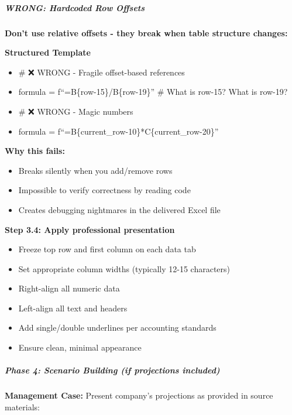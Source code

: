 \documentclass[11pt]{article}
\begin{document}
\subparagraph{WRONG: Hardcoded Row Offsets}\mbox{}\par

\textbf{Don't use relative offsets - they break when table structure changes:}


\textbf{Structured Template}
\begin{itemize}[leftmargin=*,itemsep=2pt,topsep=2pt]
\item {} \# ❌ WRONG - Fragile offset-based references
\item {} formula = f``=B\{row-15\}/B\{row-19\}'' \# What is row-15? What is row-19?
\item {} \# ❌ WRONG - Magic numbers
\item {} formula = f``=B\{current\_\allowbreak{}row-10\}*C\{current\_\allowbreak{}row-20\}''
\end{itemize}

\textbf{Why this fails:}

\begin{itemize}[leftmargin=*,itemsep=2pt,topsep=2pt]
\item {} Breaks silently when you add/remove rows
\item {} Impossible to verify correctness by reading code
\item {} Creates debugging nightmares in the delivered Excel file
\end{itemize}




\textbf{Step 3.4: Apply professional presentation}

\begin{itemize}[leftmargin=*,itemsep=2pt,topsep=2pt]
\item {} Freeze top row and first column on each data tab
\item {} Set appropriate column widths (typically 12-15 characters)
\item {} Right-align all numeric data
\item {} Left-align all text and headers
\item {} Add single/double underlines per accounting standards
\item {} Ensure clean, minimal appearance
\end{itemize}

\subparagraph{Phase 4: Scenario Building (if projections included)}\mbox{}\par

\textbf{Management Case:} Present company's projections as provided in source materials:
\end{document}
